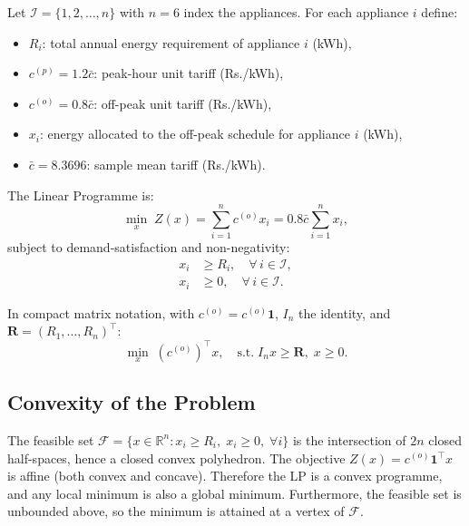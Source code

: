 \documentclass[12pt,a4paper]{article}
\begin{document}
Let $\mathcal{I} = \{1, 2, \ldots, n\}$ with $n = 6$ index the appliances.
For each appliance $i$ define:

\begin{tcolorbox}[colback=blue!5!white, colframe=isidark, title=Decision Variables and Parameters]
\begin{itemize}
  \item $R_i$: total annual energy requirement of appliance $i$ (kWh),
  \item $c^{(p)} = 1.2\bar{c}$: peak-hour unit tariff (Rs./kWh),
  \item $c^{(o)} = 0.8\bar{c}$: off-peak unit tariff (Rs./kWh),
  \item $x_i$: energy allocated to the off-peak schedule for appliance $i$ (kWh),
  \item $\bar{c} = 8.3696$: sample mean tariff (Rs./kWh).
\end{itemize}
\end{tcolorbox}

\noindent The Linear Programme is:
\begin{equation}
  \min_{x}\; Z(x) = \sum_{i=1}^{n} c^{(o)} x_i = 0.8\bar{c}\sum_{i=1}^{n} x_i,
  \label{eq:lp_obj}
\end{equation}
subject to demand-satisfaction and non-negativity:
\begin{align}
  x_i &\geq R_i, \quad \forall\, i \in \mathcal{I}, \label{eq:demand}\\
  x_i &\geq 0,   \quad \forall\, i \in \mathcal{I}. \label{eq:nonneg}
\end{align}

In compact matrix notation, with $c^{(o)} = c^{(o)}\mathbf{1}$, $I_n$ the identity,
and $\mathbf{R} = (R_1, \ldots, R_n)^\top$:
\begin{equation}
  \min_{x}\; (c^{(o)})^\top x, \quad \text{s.t.}\; I_n x \geq \mathbf{R},\; x \geq 0.
  \label{eq:compact}
\end{equation}

\subsection{Convexity of the Problem}

The feasible set $\mathcal{F} = \{x \in \mathbb{R}^n : x_i \geq R_i,\; x_i \geq 0,\;
\forall i\}$ is the intersection of $2n$ closed half-spaces, hence a closed convex
polyhedron. The objective $Z(x) = c^{(o)}\mathbf{1}^\top x$ is affine (both convex
and concave). Therefore the LP is a convex programme, and any local minimum is also a
global minimum. Furthermore, the feasible set is unbounded above, so the minimum is
attained at a vertex of $\mathcal{F}$.
\end{document}
